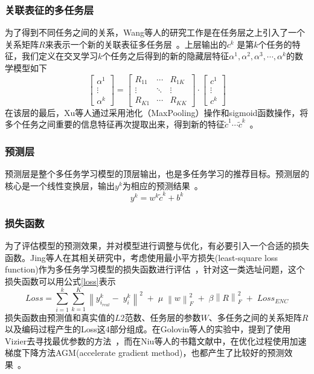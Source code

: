 \documentclass{llncs}
\begin{document}
\subsubsection{关联表征的多任务层}
为了得到不同任务之间的关系，Wang等人的研究工作是在任务层之上引入了一个关系矩阵$R$来表示一个新的关联表征多任务层~\cite{wang2016place}。上层输出的$c^k$ 是第$k$个任务的特征，我们定义在交叉学习$k$个任务之后得到的新的隐藏层特征$\alpha^1,\alpha^2,\alpha^3,\cdots,\alpha^k$的数学模型如下
$$\begin{bmatrix}\alpha^1\\\vdots\\\alpha^k\end{bmatrix}=\begin{bmatrix}R_{11}&\cdots&R_{1K}\\\vdots&\ddots&\vdots\\R_{K1}&\cdots&R_{KK}\end{bmatrix}\cdot\begin{bmatrix}c^1\\\vdots\\c^k\end{bmatrix}$$
在该层的最后，Xu等人通过采用池化（MaxPooling）操作和sigmoid函数操作，将多个任务之间重要的信息特征再次提取出来，得到新的特征$\widetilde c^1\cdots\widetilde c^k$~\cite{xu2016demand,ioffe2015batch}。
\subsubsection{预测层}
预测层是整个多任务学习模型的顶层输出，也是多任务学习的推荐目标。预测层的核心是一个线性变换层，输出$y^k$为相应的预测结果~\cite{Long2017Learning}。
$$y^k=w^k\widetilde c^k+b^k$$
\subsubsection{损失函数}
为了评估模型的预测效果，并对模型进行调整与优化，有必要引入一个合适的损失函数。Jing等人在其相关研究中，考虑使用最小平方损失(least-square loss function)作为多任务学习模型的损失函数进行评估~\cite{Jing2016Where}，针对这一类选址问题，这个损失函数可以用公式\ref{loss}表示
\begin{equation}
	\label{loss}
	Loss=\sum_{i=1}^k\sum_{k=1}^K\left\|y_{i_{real}}^k-\;y_i^k\right\|^2\;+\;\mu\;\left\|w\right\|_F^2\;+\;\beta\left\|R\right\|_F^2\;+\;Loss_{ENC}
\end{equation}
损失函数由预测值和真实值的$L2$范数、任务层的参数$W$、多任务之间的关系矩阵$R$以及编码过程产生的Loss这4部分组成。在Golovin等人的实验中，提到了使用Vizier去寻找最优参数的方法~\cite{Golovin2017Google}，而在Niu等人的书籍文献中，在优化过程使用加速梯度下降方法AGM(accelerate gradient method)，也都产生了比较好的预测效果~\cite{Niu2016Exploiting}。
\end{document}
